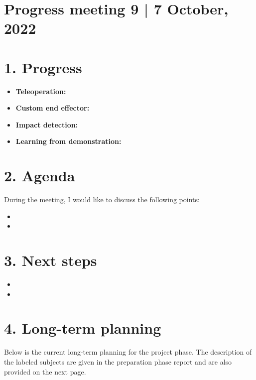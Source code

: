 \documentclass[11pt]{report}
\numberwithin{equation}{section}        %
\numberwithin{figure}{section}          %
\numberwithin{table}{section}           %
\begin{document}
  \section*{Progress meeting 9 | 7 October, 2022}


  \section*{1. Progress}
  \begin{itemize}
  \item \textbf{Teleoperation:} 
    
  \item \textbf{Custom end effector:} 
    
  \item \textbf{Impact detection:} 

  \item \textbf{Learning from demonstration:} 
    
  \end{itemize}

  \section*{2. Agenda}
  During the meeting, I would like to discuss the following points:

  \begin{itemize}
      \item  
      \item 
  \end{itemize}

  \section*{3. Next steps}

  \begin{itemize}
      \item  
      \item 
  \end{itemize}

  \section*{4. Long-term planning}
  Below is the current long-term planning for the project phase. The description of the labeled subjects are given in the preparation phase report and are also provided on the next page.
\end{document}
